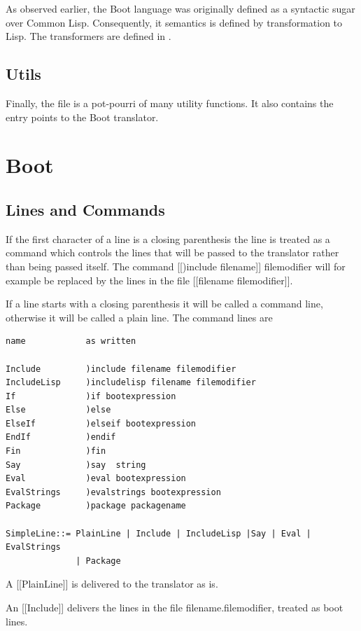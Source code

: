 \documentclass{article}
\begin{document}
As observed earlier, the Boot language was originally defined as a syntactic
sugar over Common Lisp.  Consequently, it semantics is defined by
transformation to Lisp.  The transformers are defined in
.

\subsection{Utils}
\label{sec:boot-to-cl:utils}

Finally, the file  is a pot-pourri of many utility
functions.  It also contains the entry points to the Boot translator.


\section{Boot}
\label{sec:boot}

\subsection{Lines and Commands}

If the first character of a line is a closing parenthesis the line
is treated as a command which controls the lines that will be
passed to the translator rather than being passed itself.
The command [[)include filename]] filemodifier will for example
be replaced by the lines in the file [[filename filemodifier]].

If a line starts with a closing parenthesis it will be called a command
line, otherwise it will be called a plain line.
The command lines are
\begin{verbatim}
name            as written

Include         )include filename filemodifier
IncludeLisp     )includelisp filename filemodifier
If              )if bootexpression
Else            )else
ElseIf          )elseif bootexpression
EndIf           )endif
Fin             )fin
Say             )say  string
Eval            )eval bootexpression
EvalStrings     )evalstrings bootexpression
Package         )package packagename

SimpleLine::= PlainLine | Include | IncludeLisp |Say | Eval | EvalStrings
              | Package
\end{verbatim}

A [[PlainLine]] is delivered to the translator as is.

An [[Include]] delivers the lines in the file filename.filemodifier,
treated as boot lines.
\end{document}
